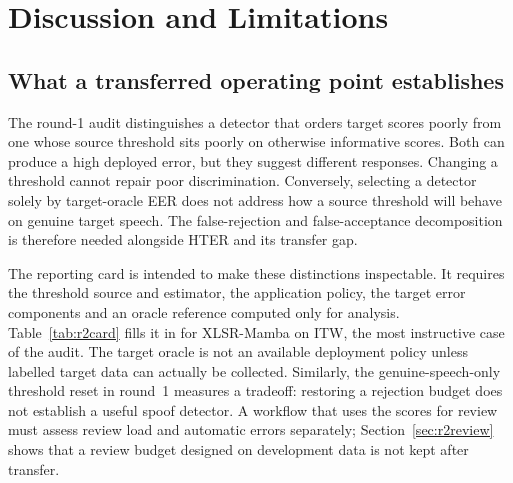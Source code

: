 \section{Discussion and Limitations}
\label{sec:discussion}
\subsection{What a transferred operating point establishes}
The round-1 audit distinguishes a detector that orders target scores poorly from one whose source threshold sits
poorly on otherwise informative scores. Both can produce a high deployed error, but they suggest different responses.
Changing a threshold cannot repair poor discrimination. Conversely, selecting a detector solely by target-oracle EER
does not address how a source threshold will behave on genuine target speech. The false-rejection and
false-acceptance decomposition is therefore needed alongside HTER and its transfer gap.

The reporting card is intended to make these distinctions inspectable. It requires the threshold source and
estimator, the application policy, the target error components and an oracle reference computed only for analysis.
Table~\ref{tab:r2card} fills it in for XLSR-Mamba on ITW, the most instructive case of the audit. The target oracle is
not an available deployment policy unless labelled target data can actually be collected. Similarly, the
genuine-speech-only threshold reset in round~1 measures a tradeoff: restoring a rejection budget does not establish a
useful spoof detector. A workflow that uses the scores for review must assess review load and automatic errors
separately; Section~\ref{sec:r2review} shows that a review budget designed on development data is not kept after
transfer.

\begin{table}[!t]
\caption{The reporting card of Table~\ref{tab:card} filled in for XLSR-Mamba on ITW (fp32; rates in \% of the target
class, TTG in pp with a speaker-cluster 95\% interval).}
\label{tab:r2card}
\centering
\footnotesize
\setlength{\tabcolsep}{4pt}
\end{table}

